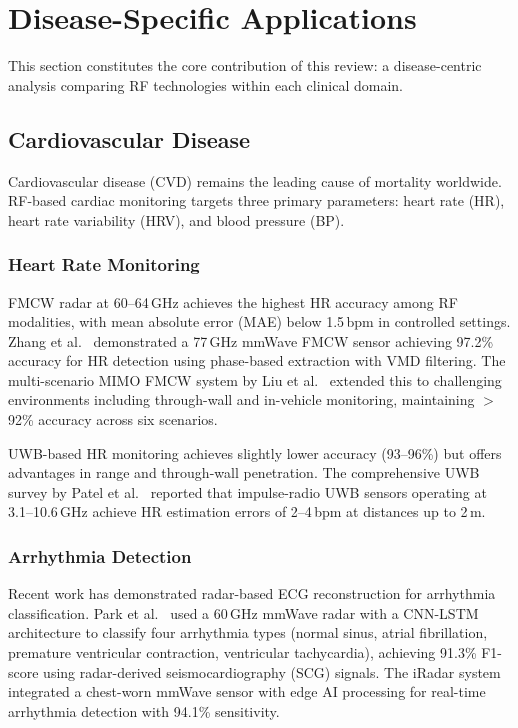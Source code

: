 \documentclass[journal,twoside]{IEEEtran}
\begin{document}
\section{Disease-Specific Applications}
\label{sec:diseases}

This section constitutes the core contribution of this review: a disease-centric analysis comparing RF technologies within each clinical domain.

\subsection{Cardiovascular Disease}
\label{subsec:cardiac}

Cardiovascular disease (CVD) remains the leading cause of mortality worldwide. RF-based cardiac monitoring targets three primary parameters: heart rate (HR), heart rate variability (HRV), and blood pressure (BP).

\subsubsection{Heart Rate Monitoring}
FMCW radar at 60--64\,GHz achieves the highest HR accuracy among RF modalities, with mean absolute error (MAE) below 1.5\,bpm in controlled settings. Zhang et al.~\cite{ref_mmwave_vital2025} demonstrated a 77\,GHz mmWave FMCW sensor achieving 97.2\% accuracy for HR detection using phase-based extraction with VMD filtering. The multi-scenario MIMO FMCW system by Liu et al.~\cite{ref_multiscenario2025} extended this to challenging environments including through-wall and in-vehicle monitoring, maintaining $>$92\% accuracy across six scenarios.

UWB-based HR monitoring achieves slightly lower accuracy (93--96\%) but offers advantages in range and through-wall penetration. The comprehensive UWB survey by Patel et al.~\cite{ref_uwb_overview2024} reported that impulse-radio UWB sensors operating at 3.1--10.6\,GHz achieve HR estimation errors of 2--4\,bpm at distances up to 2\,m.

\subsubsection{Arrhythmia Detection}
Recent work has demonstrated radar-based ECG reconstruction for arrhythmia classification. Park et al.~\cite{ref_mmwave_arrhythmia2023} used a 60\,GHz mmWave radar with a CNN-LSTM architecture to classify four arrhythmia types (normal sinus, atrial fibrillation, premature ventricular contraction, ventricular tachycardia), achieving 91.3\% F1-score using radar-derived seismocardiography (SCG) signals. The iRadar system~\cite{ref_iradar2024} integrated a chest-worn mmWave sensor with edge AI processing for real-time arrhythmia detection with 94.1\% sensitivity.
\end{document}
